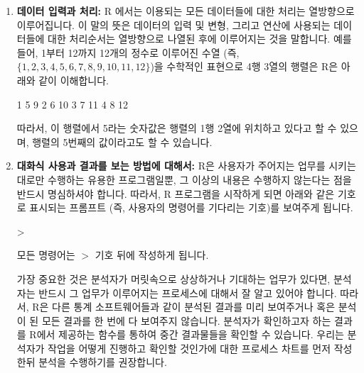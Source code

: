 \documentclass{report}
\begin{document}
\begin{enumerate}
  \item  \textbf{데이터 입력과 처리:}  R 에서는 이용되는 모든 데이터들에 대한 처리는 열방향으로 이루어집니다.
이 말의 뜻은 데이터의 입력 및 변형, 그리고 연산에 사용되는 데이터들에 대한 처리순서는 열방향으로 나열된 후에 이루어지는 것을 말합니다. 
예를들어, 1부터 12까지 12개의 정수로 이루어진 수열 (즉, $\{ 1, 2, 3, 4, 5, 6, 7, 8, 9, 10, 11, 12 \}$)을 수학적인 표현으로 4행 3열의 행렬은 R은 아래와 같이 이해합니다. 



\begin{Schunk}
\begin{Soutput}
1  5   9
2  6  10
3  7  11
4  8  12
\end{Soutput}
\end{Schunk}

따라서, 이 행렬에서 5라는 숫자값은 행렬의 1행 2열에 위치하고 있다고 할 수 있으며, 행렬의 5번째의 값이라고도 할 수 있습니다. 

  \item  \textbf{대화식 사용과 결과를 보는 방법에 대해서:} R은 사용자가 주어지는 업무를 시키는 대로만 수행하는 유용한 프로그램일뿐, 그 이상의 내용은 수행하지 않는다는 점을 반드시 명심하셔야 합니다. 
따라서, R 프로그램을 시작하게 되면 아래와 같은 기호로 표시되는 프롬프트 (즉, 사용자의 명령어를 기다리는 기호)를 보여주게 됩니다. 
\begin{Schunk}
\begin{Soutput}
>
\end{Soutput}
\end{Schunk}

모든 명령어는 $>$ 기호 뒤에 작성하게 됩니다. 

가장 중요한 것은 분석자가 머릿속으로 상상하거나 기대하는 업무가 있다면, 분석자는 반드시 그 업무가 이루어지는 프로세스에 대해서 잘 알고 있어야 합니다.
따라서, R은 다른 통계 소프트웨어들과 같이 분석된 결과를 미리 보여주거나 혹은 분석이 된 모든 결과를 한 번에 다 보여주지 않습니다.
분석자가 확인하고자 하는 결과를 R에서 제공하는 함수를 통하여 중간 결과물들을 확인할 수 있습니다. 
우리는 분석자가 작업을 어떻게 진행하고 확인할 것인가에 대한 프로세스 차트를 먼저 작성한뒤 분석을 수행하기를 권장합니다.



\end{enumerate}
\end{document}
